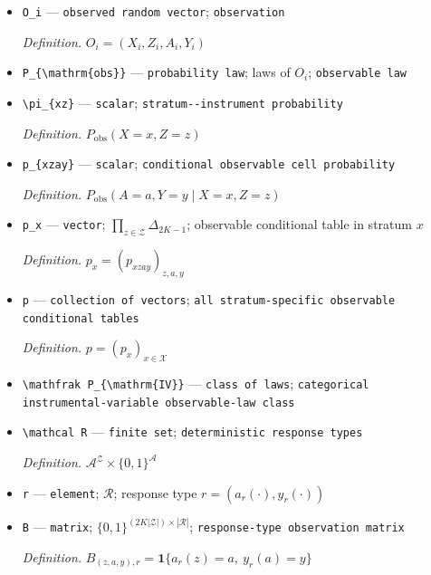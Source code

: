 \documentclass{article}
\begin{document}
\begin{itemize}
  \item \texttt{O\_\allowbreak{}i} --- \texttt{observed random vector}; \texttt{observation}
  \par\smallskip\noindent\emph{Definition.} \(O_i=(X_i,Z_i,A_i,Y_i)\)
  \item \texttt{P\_\allowbreak{}\{\textbackslash{}\allowbreak{}mathrm\{obs\}\allowbreak{}\}\allowbreak{}} --- \texttt{probability law}; laws of \(O_i\); \texttt{observable law}
  \item \texttt{\textbackslash{}\allowbreak{}pi\_\allowbreak{}\{xz\}\allowbreak{}} --- \texttt{scalar}; \texttt{stratum-\allowbreak{}-\allowbreak{}instrument probability}
  \par\smallskip\noindent\emph{Definition.} \(P_{\mathrm{obs}}(X=x,Z=z)\)
  \item \texttt{p\_\allowbreak{}\{xzay\}\allowbreak{}} --- \texttt{scalar}; \texttt{conditional observable cell probability}
  \par\smallskip\noindent\emph{Definition.} \(P_{\mathrm{obs}}(A=a,Y=y\mid X=x,Z=z)\)
  \item \texttt{p\_\allowbreak{}x} --- \texttt{vector}; \(\prod_{z\in\mathcal Z}\Delta_{2K-1}\); observable conditional table in stratum \(x\)
  \par\smallskip\noindent\emph{Definition.} \(p_x=(p_{xzay})_{z,a,y}\)
  \item \texttt{p} --- \texttt{collection of vectors}; \texttt{all stratum-\allowbreak{}specific observable conditional tables}
  \par\smallskip\noindent\emph{Definition.} \(p=(p_x)_{x\in\mathcal X}\)
  \item \texttt{\textbackslash{}\allowbreak{}mathfrak P\_\allowbreak{}\{\textbackslash{}\allowbreak{}mathrm\{IV\}\allowbreak{}\}\allowbreak{}} --- \texttt{class of laws}; \texttt{categorical instrumental-\allowbreak{}variable observable-\allowbreak{}law class}
  \item \texttt{\textbackslash{}\allowbreak{}mathcal R} --- \texttt{finite set}; \texttt{deterministic response types}
  \par\smallskip\noindent\emph{Definition.} \(\mathcal A^{\mathcal Z}\times\{0,1\}^{\mathcal A}\)
  \item \texttt{r} --- \texttt{element}; \(\mathcal R\); response type \(r=(a_r(\cdot),y_r(\cdot))\)
  \item \texttt{B} --- \texttt{matrix}; \(\{0,1\}^{(2K|\mathcal Z|)\times|\mathcal R|}\); \texttt{response-\allowbreak{}type observation matrix}
  \par\smallskip\noindent\emph{Definition.} \(B_{(z,a,y),r}=\mathbf 1\{a_r(z)=a,\ y_r(a)=y\}\)

\end{itemize}
\end{document}
